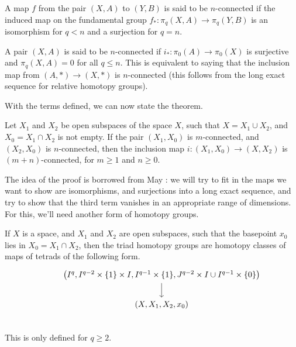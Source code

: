 \begin{defn}
  A map $f$ from the pair $(X,A)$ to $(Y,B)$ is said to be $n$-connected if the induced map on the
  fundamental group $f_{\ast}: \pi_q(X,A) \to \pi_q(Y,B)$ is an isomorphism for $q < n$ and a
  surjection for $q=n$.
\end{defn}

\begin{defn}
  A pair $(X,A)$ is said to be $n$-connected if $i_{\ast}: \pi_0(A) \to \pi_0(X)$ is surjective and
  $\pi_q(X,A) = 0$ for all $q \leq n$. This is equivalent to saying that the inclusion map from
  $(A, \ast) \to (X, \ast)$ is $n$-connected (this follows from the long exact sequence for relative
  homotopy groups).
\end{defn}
With the terms defined, we can now state the theorem.

\begin{thm}
  Let $X_1$ and $X_2$ be open subspaces of the space $X$, such that $X = X_1 \cup X_2$, and
  $X_0 = X_1 \cap X_2$ is not empty. If the pair $(X_1, X_0)$ is $m$-connected, and $(X_2, X_0)$ is
  $n$-connected, then the inclusion map $i: (X_1, X_0) \to (X, X_2)$ is $(m+n)$-connected, for
  $m \geq 1$ and $n \geq 0$.
\end{thm}
The idea of the proof is borrowed from May \cite{may} : we will try to fit in
the maps we want to show are isomorphisms, and surjections into a long exact sequence, and try to
show that the third term vanishes in an appropriate range of dimensions. For this, we'll need
another form of homotopy groups.

\begin{defn}
  If $X$ is a space, and $X_1$ and $X_2$ are open subspaces, such that the basepoint $x_0$ lies in
  $X_0 = X_1 \cap X_2$, then the triad homotopy groups are homotopy classes of maps of tetrads of
  the following form.
  \[
    \begin{tikzcd}
      &\left( I^q, I^{q-2} \times \{1\} \times I, I^{q-1} \times \{1\}, J^{q-2} \times I \cup I^{q-1} \times \{0\} \right) \ar[d] \\
      &(X, X_1, X_2, x_0) \\
    \end{tikzcd}
  \]
  This is only defined for $q \geq 2$.
\end{defn}

